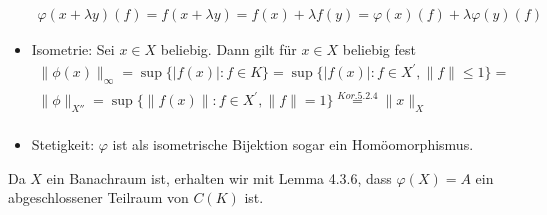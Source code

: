 \begin{solution}
\begin{itemize}
  \begin{align*}
    \varphi(x + \lambda y)(f) = f(x + \lambda y) = f(x) + \lambda f(y) = \varphi(x)(f) + \lambda \varphi(y)(f)
  \end{align*}
  \item Isometrie: Sei $x \in X$ beliebig. Dann gilt für $x \in X$ beliebig fest
  \begin{align*}
    \|\phi(x)\|_{\infty} = \sup\{|f(x)|: f \in K\}
    = \sup\{|f(x)|: f \in X^{\prime}, \|f\| \leq 1\} =\\ \|\phi\|_{X''} =
    \sup\{\|f(x)\|: f \in X^{\prime}, \|f\| = 1\} \stackrel{Kor. 5.2.4}{=} \|x\|_X \\
  \end{align*}
  \item Stetigkeit: $\varphi$ ist als isometrische Bijektion sogar ein Homöomorphismus.
\end{itemize}
Da $X$ ein Banachraum ist, erhalten wir mit Lemma 4.3.6, dass $\varphi(X) = A$
ein abgeschlossener Teilraum von $C(K)$ ist.
\end{solution}
